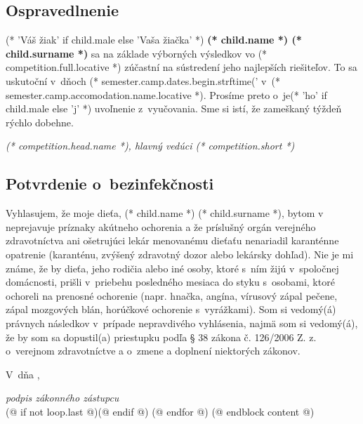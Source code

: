             \cutHere

            \subsection{Ospravedlnenie}
                (* 'Váš žiak' if child.male else 'Vaša žiačka' *) \textbf{(* child.name *) (* child.surname *)}
                sa na základe výborných výsledkov vo (* competition.full.locative *)
                zúčastní na sústredení jeho najlepších riešiteľov. To sa uskutoční v~dňoch
                (* semester.camp.dates.begin.strftime('%
                v~(* semester.camp.accomodation.name.locative *). Prosíme preto o~je(* 'ho' if child.male else 'j' *) uvoľnenie z~vyučovania.
                Sme si istí, že zameškaný týždeň rýchlo dobehne.
                \vspace{5mm}

                \hfill \dotfill

                \vspace*{-8pt}
                \hfill \textit{(* competition.head.name *), hlavný vedúci (* competition.short *)}

            \cutHere

            \subsection{Potvrdenie o~bezinfekčnosti}
                Vyhlasujem, že moje dieťa, (* child.name *) (* child.surname *), bytom v~\makebox[30mm]{\dotfill} neprejavuje príznaky akútneho ochorenia a že
                príslušný orgán verejného zdravotníctva ani ošetrujúci lekár menovanému dieťaťu nenariadil
                karanténne opatrenie (karanténu, zvýšený zdravotný dozor alebo lekársky dohľad). Nie je mi známe, že
                by dieťa, jeho rodičia alebo iné osoby, ktoré s~ním žijú v~spoločnej domácnosti, prišli v~priebehu
                posledného mesiaca do styku s~osobami, ktoré ochoreli na prenosné ochorenie (napr. hnačka, angína,
                vírusový zápal pečene, zápal mozgových blán, horúčkové ochorenie s~vyrážkami). Som si
                vedomý(á) právnych následkov v~prípade nepravdivého vyhlásenia, najmä som si vedomý(á), že by som sa
                dopustil(a) priestupku podľa § 38 zákona č. 126/2006 Z. z. o~verejnom zdravotníctve a o~zmene a
                doplnení niektorých zákonov.
                \vspace{5mm}

                V~\dotfill dňa \dotfill, \hfill \dotfill

                \vspace*{-8pt}
                \hfill \textit{podpis zákonného zástupcu} \\[5mm]

            (@ if not loop.last @)\newpage(@ endif @)
    (@ endfor @)
(@ endblock content @)
